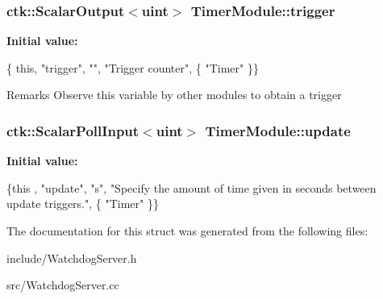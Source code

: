 \subsubsection[{\texorpdfstring{trigger}{trigger}}]{\setlength{\rightskip}{0pt plus 5cm}ctk\+::\+Scalar\+Output$<$uint$>$ Timer\+Module\+::trigger}\hypertarget{structTimerModule_a9aafb8671c7962994cd5e7df1ef2e75b}{}\label{structTimerModule_a9aafb8671c7962994cd5e7df1ef2e75b}
{\bfseries Initial value\+:}
\begin{DoxyCode}
\{ \textcolor{keyword}{this}, \textcolor{stringliteral}{"trigger"}, \textcolor{stringliteral}{""}, \textcolor{stringliteral}{"Trigger counter"},
    \{ \textcolor{stringliteral}{"Timer"} \}\}
\end{DoxyCode}
\begin{DoxyRemark}{Remarks}
Observe this variable by other modules to obtain a trigger 
\end{DoxyRemark}
\subsubsection[{\texorpdfstring{update}{update}}]{\setlength{\rightskip}{0pt plus 5cm}ctk\+::\+Scalar\+Poll\+Input$<$uint$>$ Timer\+Module\+::update}\hypertarget{structTimerModule_a05fbea3ad4ab049aac717efeae948409}{}\label{structTimerModule_a05fbea3ad4ab049aac717efeae948409}
{\bfseries Initial value\+:}
\begin{DoxyCode}
\{this , \textcolor{stringliteral}{"update"}, \textcolor{stringliteral}{"s"}, \textcolor{stringliteral}{"Specify the amount of time given in seconds between update triggers."},
    \{ \textcolor{stringliteral}{"Timer"} \}\}
\end{DoxyCode}


The documentation for this struct was generated from the following files\+:\begin{DoxyCompactItemize}
\item 
include/Watchdog\+Server.\+h\item 
src/Watchdog\+Server.\+cc\end{DoxyCompactItemize}
